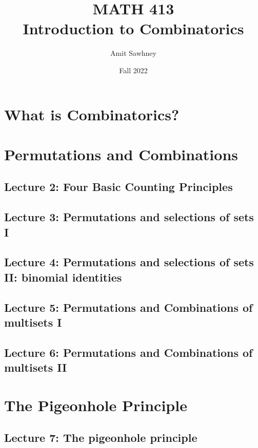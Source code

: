 \documentclass{report}
\title{\Huge{MATH 413}\\Introduction to Combinatorics}
\author{\huge{Amit Sawhney}}
\date{Fall 2022}
\begin{document}
\maketitle
\newpage%
\tableofcontents
\pagebreak

\chapter{What is Combinatorics?}

\chapter{Permutations and Combinations}

\section{Lecture 2: Four Basic Counting Principles}

\section{Lecture 3: Permutations and selections of sets I}

\section{Lecture 4: Permutations and selections of sets II: binomial identities}

\section{Lecture 5: Permutations and Combinations of multisets I}

\section{Lecture 6: Permutations and Combinations of multisets II}

\chapter{The Pigeonhole Principle}

\section{Lecture 7: The pigeonhole principle}
\end{document}
